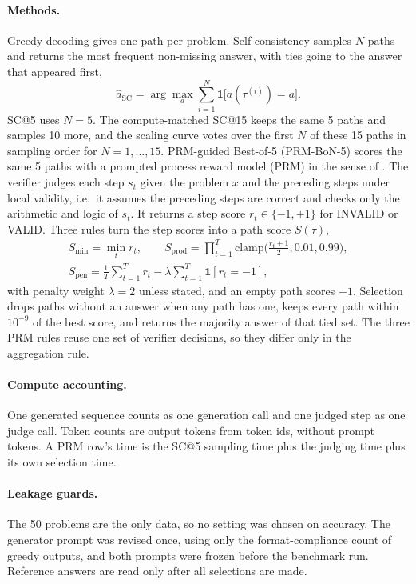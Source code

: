 \documentclass{article}
\begin{document}
\paragraph{Methods.} Greedy decoding gives one path per problem. Self-consistency \citep{wang2023selfconsistencyimproveschainthought} samples $N$ paths and returns the most frequent non-missing answer, with ties going to the answer that appeared first,
\begin{equation*}
  \hat a_{\text{SC}}=\arg\max_a \sum_{i=1}^{N}\mathbf{1}\big[a(\tau^{(i)})=a\big].
\end{equation*}
SC@5 uses $N=5$. The compute-matched SC@15 keeps the same 5 paths and samples 10 more, and the scaling curve votes over the first $N$ of these 15 paths in sampling order for $N=1,\dots,15$. PRM-guided Best-of-5 (PRM-BoN-5) scores the same 5 paths with a prompted process reward model (PRM) in the sense of \citet{lightman2023letsverifystepstep}. The verifier judges each step $s_t$ given the problem $x$ and the preceding steps under local validity, i.e.\ it assumes the preceding steps are correct and checks only the arithmetic and logic of $s_t$. It returns a step score $r_t\in\{-1,+1\}$ for INVALID or VALID. Three rules turn the step scores into a path score $S(\tau)$,
\begin{gather*}
  S_{\min}=\min_t r_t,\qquad
  S_{\text{prod}}=\prod_{t=1}^{T}\mathrm{clamp}\!\Big(\tfrac{r_t+1}{2},0.01,0.99\Big),\\
  S_{\text{pen}}=\frac{1}{T}\sum_{t=1}^{T}r_t-\lambda\sum_{t=1}^{T}\mathbf{1}[r_t=-1],
\end{gather*}
with penalty weight $\lambda=2$ unless stated, and an empty path scores $-1$. Selection drops paths without an answer when any path has one, keeps every path within $10^{-9}$ of the best score, and returns the majority answer of that tied set. The three PRM rules reuse one set of verifier decisions, so they differ only in the aggregation rule.

\paragraph{Compute accounting.} One generated sequence counts as one generation call and one judged step as one judge call. Token counts are output tokens from token ids, without prompt tokens. A PRM row's time is the SC@5 sampling time plus the judging time plus its own selection time.

\paragraph{Leakage guards.} The 50 problems are the only data, so no setting was chosen on accuracy. The generator prompt was revised once, using only the format-compliance count of greedy outputs, and both prompts were frozen before the benchmark run. Reference answers are read only after all selections are made.
\end{document}
